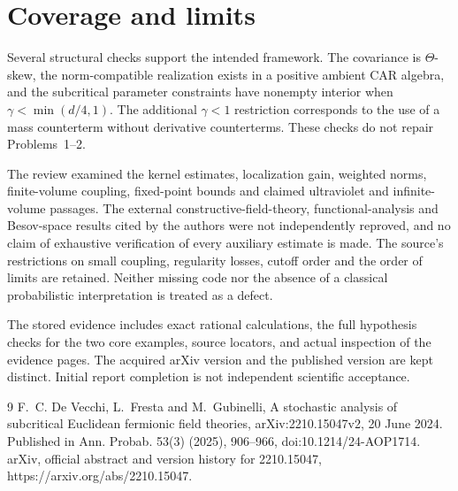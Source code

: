 \documentclass[10pt]{article}
\begin{document}
\section*{Coverage and limits}
Several structural checks support the intended framework. The covariance is \(\Theta\)-skew, the norm-compatible realization exists in a positive ambient CAR algebra, and the subcritical parameter constraints have nonempty interior when \(\gamma<\min(d/4,1)\). The additional \(\gamma<1\) restriction corresponds to the use of a mass counterterm without derivative counterterms. These checks do not repair Problems 1–2.\par
The review examined the kernel estimates, localization gain, weighted norms, finite-volume coupling, fixed-point bounds and claimed ultraviolet and infinite-volume passages. The external constructive-field-theory, functional-analysis and Besov-space results cited by the authors were not independently reproved, and no claim of exhaustive verification of every auxiliary estimate is made. The source’s restrictions on small coupling, regularity losses, cutoff order and the order of limits are retained. Neither missing code nor the absence of a classical probabilistic interpretation is treated as a defect.\par
The stored evidence includes exact rational calculations, the full hypothesis checks for the two core examples, source locators, and actual inspection of the evidence pages. The acquired arXiv version and the published version are kept distinct. Initial report completion is not independent scientific acceptance.\par
9 F. C. De Vecchi, L. Fresta and M. Gubinelli, A stochastic analysis of subcritical Euclidean fermionic field theories, arXiv:2210.15047v2, 20 June 2024. Published in Ann. Probab. 53(3) (2025), 906–966, doi:10.1214/24-AOP1714. arXiv, official abstract and version history for 2210.15047, https://arxiv.org/abs/2210.15047.\par
\end{document}
